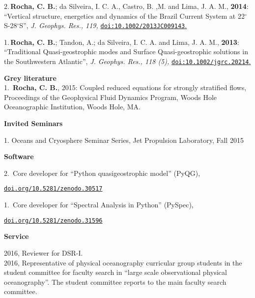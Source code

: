 \documentclass[a4paper,11pt,final]{memoir}
\newcommand{\Sep}{\vspace{1.25em}}
\newcommand{\SmallSep}{\vspace{0.5em}}
\newcommand{\CVSection}[1]
    {\Large\textbf{#1}\par
    \SmallSep\normalsize\normalfont}
\newcommand{\CVItem}[1]
    {\textbf{\color{NavyBlue} #1}}
\begin{document}
\SmallSep

2.\,\textbf{Rocha, C. B.};  da Silveira, I. C. A., Castro, B. ,M. and Lima, J. A. M., \textbf{2014}: ``Vertical structure, energetics and dynamics of the Brazil Current System at 22$^\circ$S-28$^\circ$S'', \textit{ J. Geophys. Res., 119,} \href{http://onlinelibrary.wiley.com/doi/10.1002/2013JC009143/abstract}{\texttt{doi:10.1002/2013JC009143}.} 

\SmallSep

1.\,\textbf{Rocha, C. B.}; Tandon, A.; da Silveira, I. C. A. and Lima, J. A. M., \textbf{2013}: ``Traditional Quasi-geostrophic modes and Surface Quasi-geostrophic solutions in the Southwestern Atlantic'', \textit{ J. Geophys. Res., 118 (5),} \href{http://dx.doi.org/10.1002/jgrc.20214}{\texttt{doi:10.1002/jgrc.20214}.} 

\SmallSep


\CVItem{Grey literature}\\

1.\, \textbf{Rocha, C. B.}, 2015: Coupled reduced equations for strongly stratified flows,  Proceedings of the Geophysical Fluid Dynamics Program,  Woods Hole Oceanographic Institution, Woods Hole, MA.


\clearpage
\framebreak
\framebreak

\CVSection{Invited Seminars}

1. Oceans and Cryosphere Seminar Series, Jet Propulsion Laboratory, Fall 2015

\Sep

\CVSection{Software}

2.\, Core developer for ``Python quasigeostrophic model'' (PyQG),

\href{http://dx.doi.org/10.5281/zenodo.30517}{\texttt{doi.org/10.5281/zenodo.30517}} 

\SmallSep

1.\, Core developer for ``Spectral Analysis in Python'' (PySpec),

\href{http://dx.doi.org/10.5281/zenodo.31596}{\texttt{doi.org/10.5281/zenodo.31596}} 

\Sep


\CVSection{Service}


2016, Reviewer for DSR-I. \\

2016, Representative of physical oceanography curricular group students in the student committee for
faculty search in ``large scale observational physical oceanography''. The student  committee 
reports to the main faculty search committee.\\
\end{document}
